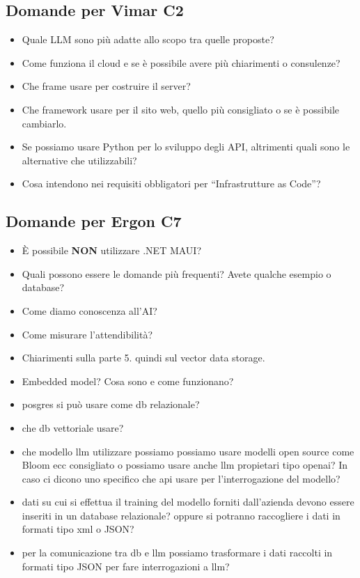 \documentclass{article}
\begin{document}
\subsection{Domande per Vimar C2}\label{subsec:domande-vimar}
\begin{itemize}
    \item Quale LLM sono più adatte allo scopo tra quelle proposte?
    \item Come funziona il cloud e se è possibile avere più chiarimenti o consulenze?
    \item Che frame usare per costruire il server?
    \item Che framework usare per il sito web, quello più consigliato o se è possibile cambiarlo.
    \item Se possiamo usare Python per lo sviluppo degli API, altrimenti quali sono le alternative che utilizzabili?
    \item Cosa intendono nei requisiti obbligatori per “Infrastrutture as Code”?
\end{itemize}

\subsection{Domande per Ergon C7}\label{subsec:domande-ergon}
\begin{itemize}
    \item È possibile \textbf{NON} utilizzare .NET MAUI?
    \item Quali possono essere le domande più frequenti? Avete qualche esempio o database?
    \item Come diamo conoscenza all'AI?
    \item Come misurare l'attendibilità?
    \item Chiarimenti sulla parte 5. quindi sul vector data storage.
    \item Embedded model? Cosa sono e come funzionano?
    \item posgres si può usare come db relazionale?
    \item che db vettoriale usare?
    \item che modello llm utilizzare possiamo possiamo usare modelli open source come Bloom ecc consigliato o possiamo usare anche llm propietari tipo openai? In caso ci dicono uno specifico che api usare per l'interrogazione del modello?
    \item  dati su cui si effettua il training del modello forniti dall'azienda devono essere inseriti in un database relazionale? oppure si potranno raccogliere i dati in formati tipo xml o JSON?
    \item per la comunicazione tra db e llm possiamo trasformare i dati raccolti in formati tipo JSON per fare interrogazioni a llm?
\end{itemize}
\end{document}

